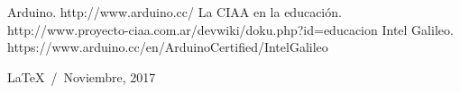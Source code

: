 \documentclass[a4paper]{article}
\begin{document}
\begin{thebibliography}{9}
   Arduino. http://www.arduino.cc/
   La CIAA en la educación. http://www.proyecto-ciaa.com.ar/devwiki/doku.php?id=educacion
   Intel Galileo. https://www.arduino.cc/en/ArduinoCertified/IntelGalileo
\end{thebibliography}

\vfill
\begin{flushright}
  \LaTeX~/~Noviembre, 2017
\end{flushright}
\end{document}

